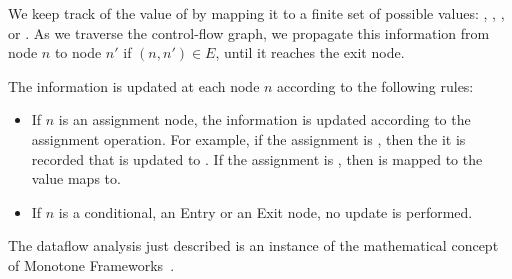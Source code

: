 We keep track of the value of  by mapping it to a finite set of possible values:
, , , or . 
As we traverse the control-flow graph, we propagate this information from node 
$n$ to node $n'$ if $(n,n')\in E$, until it reaches the exit node.

The information is updated at each node $n$ according to the following rules:
\begin{itemize}
\item If $n$ is an assignment node, the information is updated according to the
assignment operation. For example, if the assignment is , then the
it is recorded that  is updated to . If the assignment is , then 
 is mapped to the value  maps to.
\item If $n$ is a conditional, an Entry or an Exit node, no update is performed.
\end{itemize}

The dataflow analysis just described is an instance of the mathematical concept of
Monotone Frameworks~\cite{Nielson2010Principles}.

